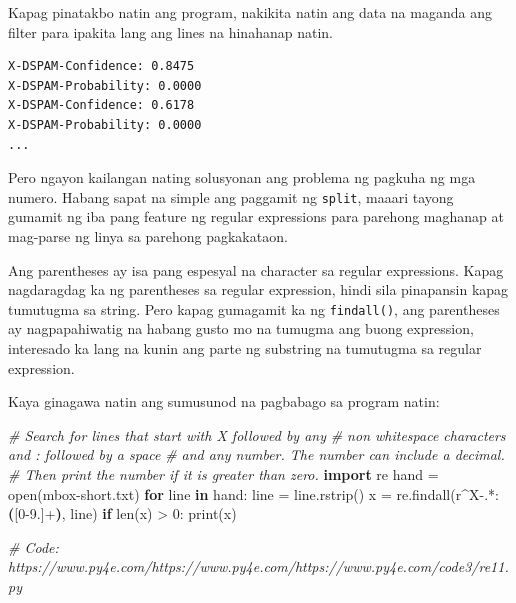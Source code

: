 \documentclass[10pt,]{book}
\newenvironment{Shaded}{}{}
\newcommand{\BuiltInTok}[1]{\textcolor[rgb]{0.00,0.50,0.00}{#1}}
\newcommand{\CommentTok}[1]{\textcolor[rgb]{0.38,0.63,0.69}{\textit{#1}}}
\newcommand{\ControlFlowTok}[1]{\textcolor[rgb]{0.00,0.44,0.13}{\textbf{#1}}}
\newcommand{\DecValTok}[1]{\textcolor[rgb]{0.25,0.63,0.44}{#1}}
\newcommand{\ImportTok}[1]{\textcolor[rgb]{0.00,0.50,0.00}{\textbf{#1}}}
\newcommand{\KeywordTok}[1]{\textcolor[rgb]{0.00,0.44,0.13}{\textbf{#1}}}
\newcommand{\NormalTok}[1]{#1}
\newcommand{\OperatorTok}[1]{\textcolor[rgb]{0.40,0.40,0.40}{#1}}
\newcommand{\PreprocessorTok}[1]{\textcolor[rgb]{0.74,0.48,0.00}{#1}}
\newcommand{\StringTok}[1]{\textcolor[rgb]{0.25,0.44,0.63}{#1}}
\newcommand{\VerbatimStringTok}[1]{\textcolor[rgb]{0.25,0.44,0.63}{#1}}
\begin{document}
Kapag pinatakbo natin ang program, nakikita natin ang data na maganda
ang filter para ipakita lang ang lines na hinahanap natin.

{\small
\begin{verbatim}
X-DSPAM-Confidence: 0.8475
X-DSPAM-Probability: 0.0000
X-DSPAM-Confidence: 0.6178
X-DSPAM-Probability: 0.0000
...
\end{verbatim}
}

Pero ngayon kailangan nating solusyonan ang problema ng pagkuha ng mga
numero. Habang sapat na simple ang paggamit ng \texttt{split}, maaari
tayong gumamit ng iba pang feature ng regular expressions para parehong
maghanap at mag-parse ng linya sa parehong pagkakataon.


Ang parentheses ay isa pang espesyal na character sa regular
expressions. Kapag nagdaragdag ka ng parentheses sa regular expression,
hindi sila pinapansin kapag tumutugma sa string. Pero kapag gumagamit ka
ng \texttt{findall()}, ang parentheses ay nagpapahiwatig na habang gusto
mo na tumugma ang buong expression, interesado ka lang na kunin ang
parte ng substring na tumutugma sa regular expression.

 

Kaya ginagawa natin ang sumusunod na pagbabago sa program natin:

\begin{Shaded}
\begin{Highlighting}[]
\CommentTok{\# Search for lines that start with \textquotesingle{}X\textquotesingle{} followed by any}
\CommentTok{\# non whitespace characters and \textquotesingle{}:\textquotesingle{} followed by a space}
\CommentTok{\# and any number. The number can include a decimal.}
\CommentTok{\# Then print the number if it is greater than zero.}
\ImportTok{import}\NormalTok{ re}
\NormalTok{hand }\OperatorTok{=} \BuiltInTok{open}\NormalTok{(}\StringTok{\textquotesingle{}mbox{-}short.txt\textquotesingle{}}\NormalTok{)}
\ControlFlowTok{for}\NormalTok{ line }\KeywordTok{in}\NormalTok{ hand:}
\NormalTok{    line }\OperatorTok{=}\NormalTok{ line.rstrip()}
\NormalTok{    x }\OperatorTok{=}\NormalTok{ re.findall(}\VerbatimStringTok{r\textquotesingle{}}\DecValTok{\^{}}\VerbatimStringTok{X{-}}\DecValTok{.}\OperatorTok{*}\VerbatimStringTok{: }\KeywordTok{(}\PreprocessorTok{[0{-}9.]}\OperatorTok{+}\KeywordTok{)}\VerbatimStringTok{\textquotesingle{}}\NormalTok{, line)}
    \ControlFlowTok{if} \BuiltInTok{len}\NormalTok{(x) }\OperatorTok{\textgreater{}} \DecValTok{0}\NormalTok{:}
        \BuiltInTok{print}\NormalTok{(x)}

\CommentTok{\# Code: https://www.py4e.com/https://www.py4e.com/https://www.py4e.com/code3/re11.py}
\end{Highlighting}
\end{Shaded}
\end{document}
